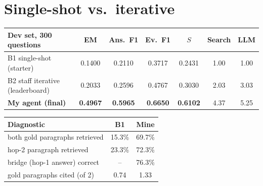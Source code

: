\documentclass[10pt,a4paper]{article}
\begin{document}
\section{Single-shot vs.\ iterative}
\begin{minipage}[t]{0.585\textwidth}
\vspace{0pt}
\centering\footnotesize
\begin{tabular}{@{}lcccccc@{}}
\toprule
Dev set, 300 questions & EM & Ans.\ F1 & Ev.\ F1 & $S$ & Search & LLM\\
\midrule
B1 single-shot (starter) & 0.1400 & 0.2110 & 0.3717 & 0.2431 & 1.00 & 1.00\\
B2 staff iterative (leaderboard) & 0.2033 & 0.2596 & 0.4767 & 0.3030 & 2.03 & 3.03\\
\textbf{My agent (final)} & \textbf{0.4967} & \textbf{0.5965} & \textbf{0.6650} & \textbf{0.6102} & 4.37 & 5.25\\
\bottomrule
\end{tabular}
\label{tab:main}
\end{minipage}\hfill
\begin{minipage}[t]{0.395\textwidth}
\vspace{0pt}
\centering\footnotesize
\begin{tabular}{@{}lcc@{}}
\toprule
Diagnostic & B1 & Mine\\
\midrule
both gold paragraphs retrieved & 15.3\% & 69.7\%\\
hop-2 paragraph retrieved & 23.3\% & 72.3\%\\
bridge (hop-1 answer) correct & -- & 76.3\%\\
gold paragraphs cited (of 2) & 0.74 & 1.33\\
\bottomrule
\end{tabular}
\end{minipage}

\end{document}
